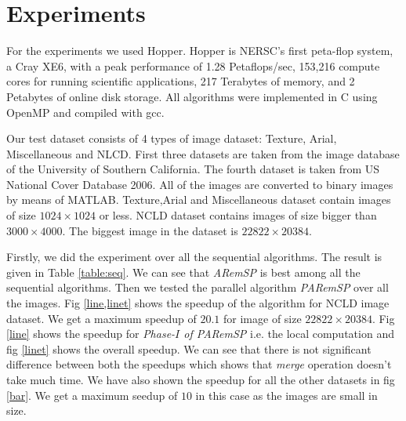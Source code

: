\section{Experiments}

For the experiments we used Hopper. Hopper is NERSC's first peta-flop system, a Cray XE6, with a peak performance of 1.28 Petaflops/sec, 
153,216 compute cores for running scientific applications, 217 Terabytes of memory, and 2 Petabytes of online disk storage. All algorithms
were implemented in C using OpenMP and compiled with gcc.

Our test dataset consists of 4 types of image dataset: Texture, Arial, Miscellaneous and NLCD. First three datasets are taken from the image database
of the University of Southern California. The fourth dataset is taken from US National Cover Database 2006. All of the images are converted to binary
images by means of MATLAB. Texture,Arial and Miscellaneous dataset contain images of size $1024 \times 1024$ or less. NCLD dataset contains images of
size bigger than $3000 \times 4000$. The biggest image in the dataset is $22822 \times 20384$. 

Firstly, we did the experiment over all the sequential algorithms. The result is given in Table \ref{table:seq}. We can see that {\em ARemSP} is best among all
the sequential algorithms. Then we tested the parallel algorithm {\em PARemSP} over all the images. Fig \ref{line,linet} shows the speedup of the algorithm for 
NCLD image dataset. We get a maximum speedup of $20.1$ for image of size $22822 \times 20384$. Fig \ref{line} shows the speedup for {\em Phase-$I$ of PARemSP} i.e. 
the local computation and fig \ref{linet} shows the overall speedup. We can see that there is not significant difference between both the speedups which shows that 
{\em merge} operation doesn't take much time. We have also shown the speedup for all the other datasets in fig \ref{bar}. We get a maximum seedup of $10$ in this 
case as the images are small in size.  


